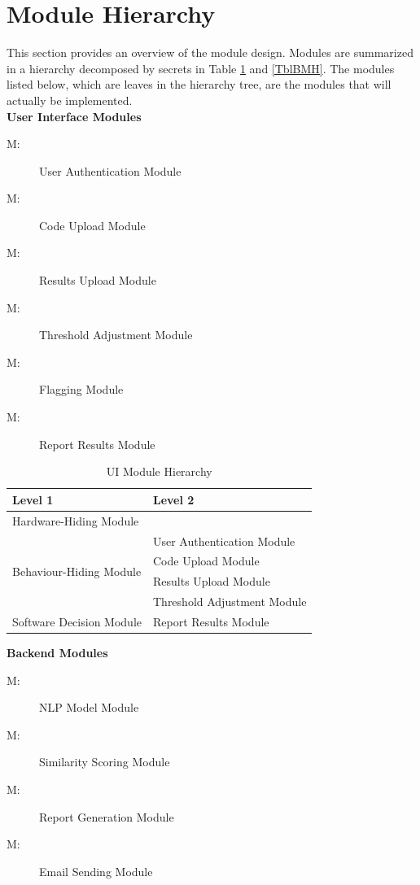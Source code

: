 \documentclass[12pt, titlepage]{article}
\newcounter{mnum}
\newcommand{\mthemnum}{M\themnum}
\begin{document}
\section{Module Hierarchy} \label{SecMH}

This section provides an overview of the module design. Modules are summarized
in a hierarchy decomposed by secrets in Table \ref{TblUIMH} and \ref{TblBMH}. The modules listed
below, which are leaves in the hierarchy tree, are the modules that will
actually be implemented. \\

\textbf{User Interface Modules}
\begin{description}
  \item [ \mthemnum \label{mAuth}:] User Authentication Module
  \item [ \mthemnum \label{mCodeUpload}:] Code Upload Module
  \item [ \mthemnum \label{mResultsUpload}:] Results Upload Module
  \item [ \mthemnum \label{mThreshold}:] Threshold Adjustment Module
  \item [ \mthemnum \label{mFlagging}:] Flagging Module
  \item [ \mthemnum \label{mResults}:] Report Results Module
\end{description}

\begin{table}[h!]
  \centering
  \begin{tabular}{p{} p{}}
  \toprule
  \textbf{Level 1} & \textbf{Level 2} \\
  \midrule
  {Hardware-Hiding Module} & ~ \\
  \midrule
  \multirow{4}{*}{Behaviour-Hiding Module} & User Authentication Module \\
  & Code Upload Module \\
  & Results Upload Module \\
  & Threshold Adjustment Module \\
  \midrule
  \multirow{1}{*}{Software Decision Module} & Report Results Module \\
  \bottomrule
  \end{tabular}
  \caption{UI Module Hierarchy}
  \label{TblUIMH}
\end{table}

\textbf{Backend Modules}
\begin{description}
  \item [ \mthemnum \label{mNLP}:] NLP Model Module
  \item [ \mthemnum \label{mScoring}:] Similarity Scoring Module
  \item [ \mthemnum \label{mReport}:] Report Generation Module
  \item [ \mthemnum \label{mEmail}:] Email Sending Module
\end{description}
\end{document}

